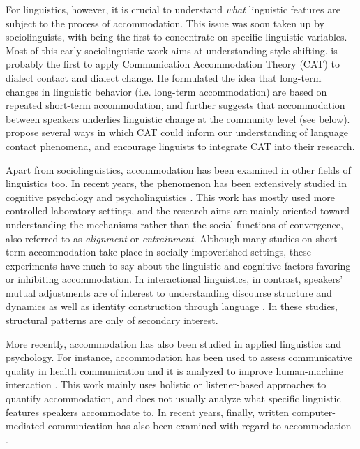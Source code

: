 \documentclass[output=paper]{langscibook}
\begin{document}
For linguistics, however, it is crucial to understand \textit{what} linguistic features are subject to the process of accommodation. This issue was soon taken up by sociolinguists, with \textcite{coupland_accommodation_1984} being the first to concentrate on specific linguistic variables. Most of this early sociolinguistic work \citep[e.g.][]{rickford_adressee-_1994,coupland_accommodation_1984,bell_language_1984,selting_levels_1985} aims at understanding style-shifting. \textcite{trudgill_dialects_1986} is probably the first to apply Communication Accommodation Theory (CAT) to dialect contact and dialect change. He formulated the idea that long-term changes in linguistic behavior (i.e. long-term accommodation) are based on repeated short-term accommodation, and further suggests that accommodation between speakers underlies linguistic change at the community level (see below). \textcite{niedzielskietal1996linguistic} propose several ways in which CAT could inform our understanding of language contact phenomena, and encourage linguists to integrate CAT into their research.

Apart from sociolinguistics, accommodation has been examined in other fields of linguistics too. In recent years, the phenomenon has been extensively studied in cognitive psychology and psycholinguistics \parencite{garrodetal_2004_why,casasantoetal_2010_virtually}. This work has mostly used more controlled laboratory settings, and the research aims are mainly oriented toward understanding the mechanisms rather than the social functions of convergence, also referred to as \textit{alignment} or \textit{entrainment}. 
Although many studies on short-term accommodation take place in socially impoverished settings, these experiments have much to say about the linguistic and cognitive factors favoring or inhibiting accommodation. In interactional linguistics, in contrast, speakers' mutual adjustments are of interest to understanding discourse structure and dynamics as well as identity construction through language \citep[e.g.][]{chakrani_arabic_2015,nilsson_dialect_2015}. In these studies, structural patterns are only of secondary interest.

More recently, accommodation has also been studied in applied linguistics and psychology. For instance, accommodation has been used to assess communicative quality in health communication \parencite[see ][]{farzadnia_giles_2015_patient} 
and it is analyzed to improve human-machine interaction  \citep[e.g.][]{linnemann_as_2016}. This work mainly uses holistic or listener-based approaches to quantify accommodation, and does not usually analyze what specific linguistic features speakers accommodate to. In recent years, finally, written computer-mediated communication has also been examined with regard to accommodation \citep[e.g.][]{Danescu-Niculescu-Mizil2011,felder2023individuelle}.
\end{document}
